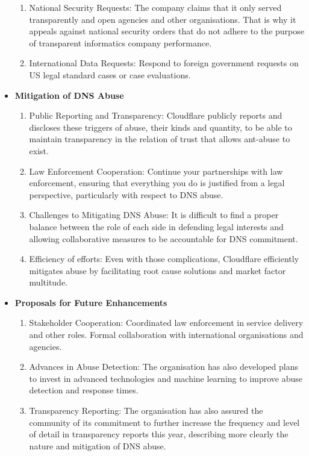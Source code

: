\begin{itemize}
\begin{enumerate}
        \item National Security Requests: The company claims that it only served transparently and open agencies and other organisations. That is why it appeals against national security orders that do not adhere to the purpose of transparent informatics company performance.
        \item International Data Requests: Respond to foreign government requests on US legal standard cases or case evaluations.
    \end{enumerate}
    \item \textbf{Mitigation of DNS Abuse}
    \begin{enumerate}
        \item Public Reporting and Transparency: Cloudflare publicly reports and discloses these triggers of abuse, their kinds and quantity, to be able to maintain transparency in the relation of trust that allows ant-abuse to exist. 
        \item Law Enforcement Cooperation: Continue your partnerships with law enforcement, ensuring that everything you do is justified from a legal perspective, particularly with respect to DNS abuse.
        \item Challenges to Mitigating DNS Abuse: It is difficult to find a proper balance between the role of each side in defending legal interests and allowing collaborative measures to be accountable for DNS commitment. 
        \item Efficiency of efforts: Even with those complications, Cloudflare efficiently mitigates abuse by facilitating root cause solutions and market factor multitude.
    \end{enumerate}
    \item \textbf{Proposals for Future Enhancements}
    \begin{enumerate}
    \item Stakeholder Cooperation: Coordinated law enforcement in service delivery and other roles. Formal collaboration with international organisations and agencies. 
    \item Advances in Abuse Detection: The organisation has also developed plans to invest in advanced technologies and machine learning to improve abuse detection and response times. 
    \item Transparency Reporting: The organisation has also assured the community of its commitment to further increase the frequency and level of detail in transparency reports this year, describing more clearly the nature and mitigation of DNS abuse.

\end{enumerate}
\end{itemize}

